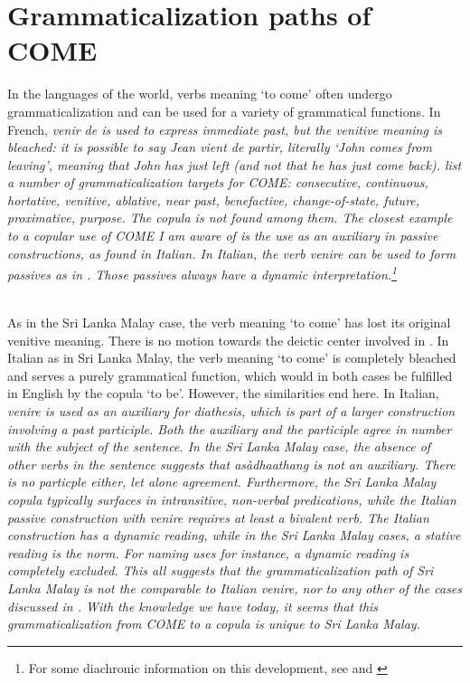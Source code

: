 \documentclass[a4paper,12pt]{article}
\begin{document}
\section{Grammaticalization paths of COME}\label{sec:targets}
In the languages of the world, verbs meaning `to come' often undergo grammaticalization and can be used for a variety of grammatical functions. In French, \em venir de \em is used to express immediate past, but the venitive meaning is bleached: it is possible to say \em Jean vient de partir\em, literally `John comes from leaving', meaning that John has just left (and not that he has just come back). \citet[68--78]{HeineEtAl2002} list a number of grammaticalization targets for COME: consecutive, continuous, hortative, venitive, ablative, near past, benefactive, change-of-state, future, proximative, purpose. The copula is not found among them. The closest example to a copular use of COME I am aware of is the use as an auxiliary in passive constructions, as found in Italian. In Italian, the verb \em venire \em  can be used to form passives as in . Those passives always have a dynamic interpretation.\footnote{For some diachronic information on this development, see \citet{Michaelis1997venire} and \citet{Giacalone2000venire}}


 \\

As in the Sri Lanka Malay case, the verb meaning `to come' has lost its original venitive meaning. There is no motion towards the deictic center involved in . In Italian as in Sri Lanka Malay, the verb meaning `to come' is completely bleached and serves a purely grammatical function, which would in both cases be fulfilled in English by the copula `to be'. However, the similarities end here. In Italian, \em venire \em is used as an auxiliary for diathesis, which is part of a larger construction involving a past participle. Both the auxiliary and the participle agree in number with the subject of the sentence. In the Sri Lanka Malay case, the absence of other verbs in the sentence suggests that  \em asàdhaathang \em is not an auxiliary. There is no particple either, let alone agreement.  Furthermore, the Sri Lanka Malay copula typically surfaces in intransitive, non-verbal predications, while the Italian passive construction with \em venire \em requires at least a bivalent verb. The Italian construction has a dynamic reading, while in the Sri Lanka Malay cases, a stative reading is the norm. For naming uses for instance, a dynamic reading is completely excluded. This all suggests that the grammaticalization path of Sri Lanka Malay  is not the comparable to  Italian \em venire\em, nor to any other of the cases discussed in \citet{HeineEtAl2002}. With the knowledge we have today, it seems that this grammaticalization from COME to a copula is unique to Sri Lanka Malay.
\end{document}
